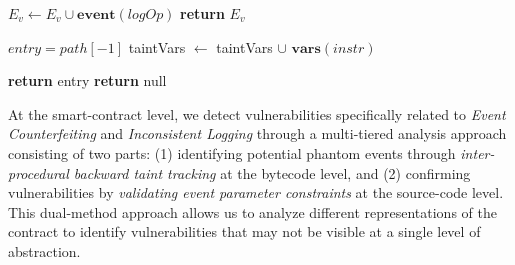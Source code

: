 \begin{algorithm}[t]
\begin{algorithmic}[1]
        \EndIf
        
      \EndFor
               \State $E_v \gets E_v \cup \textbf{event}(logOp)$ 
        \EndIf
    \EndFor
    \State \textbf{return} $E_v$

  \State $entry = path[-1]$  \label{begin:taintanalysis}
        \State taintVars $\gets$ taintVars $\cup$ $\textbf{vars}(instr)$  
    \EndIf
  \EndFor

    \State \textbf{return} entry
  \Else 
    \State \textbf{return} null  \label{end:taintanalysis}
  \EndIf 
  
\EndProcedure 


  \end{algorithmic}
  \label{algorithm}
\end{algorithm}


At the smart-contract level, we detect vulnerabilities specifically related to \emph{Event Counterfeiting} and \emph{Inconsistent Logging} through a multi-tiered analysis approach consisting of two parts: (1) identifying potential phantom events through \emph{inter-procedural backward taint tracking} at the bytecode level, and (2) confirming vulnerabilities by \emph{validating event parameter constraints} at the source-code level.
This dual-method approach allows us to analyze different representations of the contract to
identify vulnerabilities that may not be visible at a single level of abstraction.

